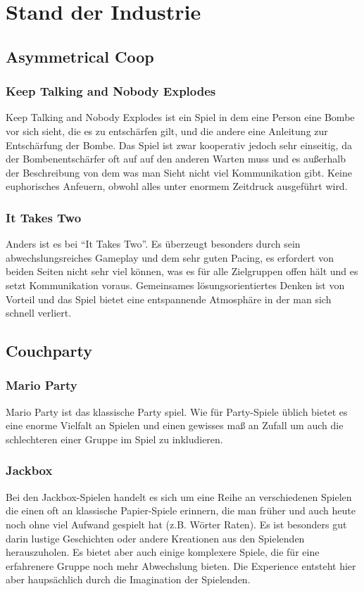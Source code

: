 \chapter{Stand der Industrie\label{_industrie}}

\section{Asymmetrical Coop}

\subsection{Keep Talking and Nobody Explodes}
Keep Talking and Nobody Explodes ist ein Spiel in dem eine Person eine Bombe vor sich sieht, die es zu entschärfen gilt, und die andere eine Anleitung zur Entschärfung der Bombe. Das Spiel ist zwar kooperativ jedoch sehr einseitig, da der Bombenentschärfer oft auf auf den anderen Warten muss und es außerhalb der Beschreibung von dem was man Sieht nicht viel Kommunikation gibt. Keine euphorisches Anfeuern, obwohl alles unter enormem Zeitdruck ausgeführt wird.

\subsection{It Takes Two}
Anders ist es bei "`It Takes Two"'. Es überzeugt besonders durch sein abwechslungsreiches Gameplay und dem sehr guten Pacing, es erfordert von beiden Seiten nicht sehr viel können, was es für alle Zielgruppen offen hält und es setzt Kommunikation voraus. Gemeinsames lösungsorientiertes Denken ist von Vorteil und das Spiel bietet eine entspannende Atmosphäre in der man sich schnell verliert.

\section{Couchparty}

\subsection{Mario Party}
Mario Party ist das klassische Party spiel. Wie für Party-Spiele üblich bietet es eine enorme Vielfalt an Spielen und einen gewisses maß an Zufall um auch die schlechteren einer Gruppe im Spiel zu inkludieren.

\subsection{Jackbox}
Bei den Jackbox-Spielen handelt es sich um eine Reihe an verschiedenen Spielen die einen oft an klassische Papier-Spiele erinnern, die man früher und auch heute noch ohne viel Aufwand gespielt hat (z.B. Wörter Raten). Es ist besonders gut darin lustige Geschichten oder andere Kreationen aus den Spielenden herauszuholen. Es bietet aber auch einige komplexere Spiele, die für eine erfahrenere Gruppe noch mehr Abwechslung bieten. Die Experience entsteht hier aber haupsächlich durch die Imagination der Spielenden.

